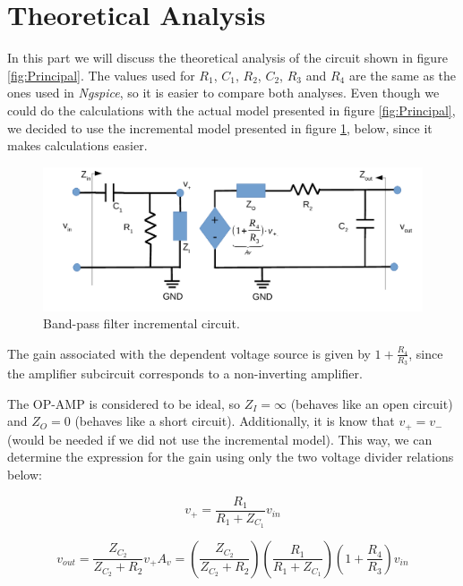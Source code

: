 \clearpage

\section{Theoretical Analysis}
\label{sec:analysis}

In this part we will discuss the theoretical analysis of the circuit shown in figure \ref{fig:Principal}.
The values used for $R_1$, $C_1$, $R_2$, $C_2$, $R_3$ and $R_4$ are the same as the ones used in \textit{Ngspice}, so it is easier
to compare both analyses. Even though we could do the calculations with the actual model presented in figure
\ref{fig:Principal}, we decided to use the incremental model presented in figure \ref{fig:Incremental}, below, since it makes calculations easier.

\begin{figure}[h] \centering
    \includegraphics[scale=0.65]{lab5_incremental.pdf}
    \caption{Band-pass filter incremental circuit.}
    \label{fig:Incremental}
\end{figure}

The gain associated with the dependent voltage source is given by $1+\frac{R_4}{R_3}$, since the amplifier subcircuit 
corresponds to a non-inverting amplifier. 

The OP-AMP is considered to be ideal, so $Z_I=\infty$ (behaves like an open circuit) and $Z_O=0$ (behaves like a short circuit).
Additionally, it is know that $v_{+}=v_{-}$ (would be needed if we did not use the incremental model).
This way, we can determine the expression for the gain using only the two voltage divider relations below:

\begin{equation}\label{eq:2}
  v_{+}=\frac{R_1}{R_1+Z_{C_1}}v_{in}
\end{equation}

\begin{equation}
  v_{out}=\frac{Z_{C_2}}{Z_{C_2}+R_2}v_{+}A_v=(\frac{Z_{C_2}}{Z_{C_2}+R_2})(\frac{R_1}{R_1+Z_{C_1}})(1+\frac{R_4}{R_3})v_{in}
\end{equation} 

